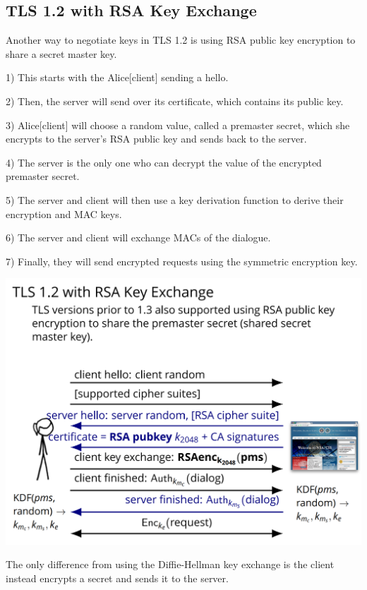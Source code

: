 \documentclass[11pt]{article} %
\begin{document}
\subsection{TLS 1.2 with RSA Key Exchange}
Another way to negotiate keys in TLS 1.2 is using RSA public key encryption to 
share a secret master key.

\bigskip
{\parindent0pt 1) This starts with the Alice[client] sending a hello.}

\smallskip
{\parindent0pt 2) Then, the server will send over its certificate, which 
contains its public key.}

\smallskip
{\parindent0pt 3) Alice[client] will choose a random value, called a premaster 
secret, which she encrypts to the server's RSA public key and sends back to the 
server.}

\smallskip
{\parindent0pt 4) The server is the only one who can decrypt the value of the 
encrypted premaster secret.}

\smallskip
{\parindent0pt 5) The server and client will then use a key derivation function 
to derive their encryption and MAC keys.}

\smallskip
{\parindent0pt 6) The server and client will exchange MACs of the dialogue.}

\smallskip
{\parindent0pt 7) Finally, they will send encrypted requests using the symmetric 
encryption key.}

\includegraphics[scale=.6]{./TLS_RSA.png}

The only difference from using the Diffie-Hellman key exchange is the client 
instead encrypts a secret and sends it to the server.
\end{document}
